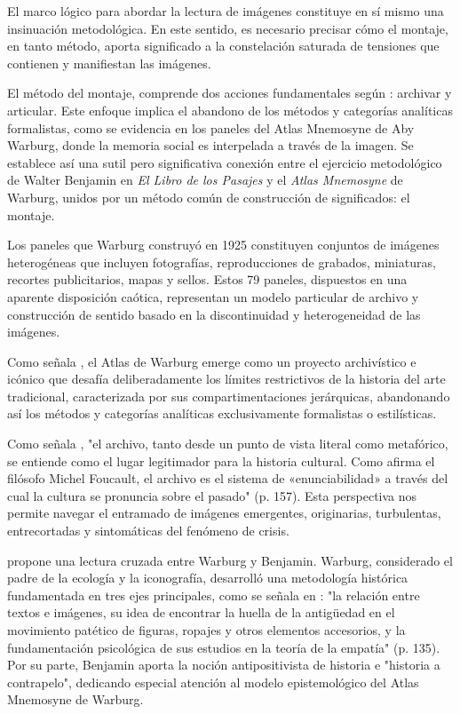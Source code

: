 El marco lógico para abordar la lectura de imágenes constituye en sí mismo una insinuación metodológica. En este sentido, es necesario precisar cómo el montaje, en tanto método, aporta significado a la constelación saturada de tensiones que contienen y manifiestan las imágenes.

El método del montaje, comprende dos acciones fundamentales según \parencite{Guasch2005}: archivar y articular. Este enfoque implica el abandono de los métodos y categorías analíticas formalistas, como se evidencia en los paneles del Atlas Mnemosyne de Aby Warburg, donde la memoria social es interpelada a través de la imagen. Se establece así una sutil pero significativa conexión entre el ejercicio metodológico de Walter Benjamin en \textit{El Libro de los Pasajes} y el \textit{Atlas Mnemosyne} de Warburg, unidos por un método común de construcción de significados: el montaje.

Los paneles que Warburg construyó en 1925 constituyen conjuntos de imágenes heterogéneas que incluyen fotografías, reproducciones de grabados, miniaturas, recortes publicitarios, mapas y sellos. Estos 79 paneles, dispuestos en una aparente disposición caótica, representan un modelo particular de archivo y construcción de sentido basado en la discontinuidad y heterogeneidad de las imágenes.

Como señala \parencite{Guasch2011}, el Atlas de Warburg emerge como un proyecto archivístico e icónico que desafía deliberadamente los límites restrictivos de la historia del arte tradicional, caracterizada por sus compartimentaciones jerárquicas, abandonando así los métodos y categorías analíticas exclusivamente formalistas o estilísticas.

Como señala \parencite{Guasch2005}, "el archivo, tanto desde un punto de vista literal como metafórico, se entiende como el lugar legitimador para la historia cultural. Como afirma el filósofo Michel Foucault, el archivo es el sistema de «enunciabilidad» a través del cual la cultura se pronuncia sobre el pasado" (p. 157). Esta perspectiva nos permite navegar el entramado de imágenes emergentes, originarias, turbulentas, entrecortadas y sintomáticas del fenómeno de crisis.

\parencite{Guasch2011} propone una lectura cruzada entre Warburg y Benjamin. Warburg, considerado el padre de la ecología y la iconografía, desarrolló una metodología histórica fundamentada en tres ejes principales, como se señala en \parencite{Warburg2010}: "la relación entre textos e imágenes, su idea de encontrar la huella de la antigüedad en el movimiento patético de figuras, ropajes y otros elementos accesorios, y la fundamentación psicológica de sus estudios en la teoría de la empatía" (p. 135). Por su parte, Benjamin aporta la noción antipositivista de historia e "historia a contrapelo", dedicando especial atención al modelo epistemológico del Atlas Mnemosyne de Warburg.


